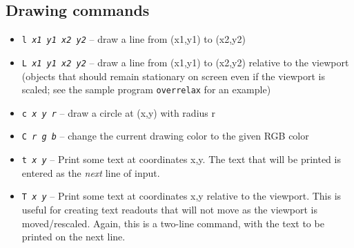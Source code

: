 \documentclass[12pt]{article}
\begin{document}
\subsection {Drawing commands}
\begin{itemize}
\item {\tt l {\it x1 y1 x2 y2}} -- draw a line from (x1,y1) to (x2,y2)
\item {\tt L {\it x1 y1 x2 y2}} -- draw a line from (x1,y1) to (x2,y2) relative to the viewport (objects that should remain stationary on screen even if the viewport is scaled; see the sample program {\tt overrelax} for an example)
\item {\tt c {\it x y r}} -- draw a circle at (x,y) with radius r
\item {\tt C {\it r g b}} -- change the current drawing color to the given RGB color
\item {\tt t {\it x y}} -- Print some text at coordinates x,y. The text that will be printed is entered as the {\it next} line of input.
\item {\tt T {\it x y}} -- Print some text at coordinates x,y relative to the viewport. This is useful for creating text readouts that will not move as the viewport is moved/rescaled. Again, this is a two-line command, with the text to be printed on the next line.
\end{itemize}
\end{document}
